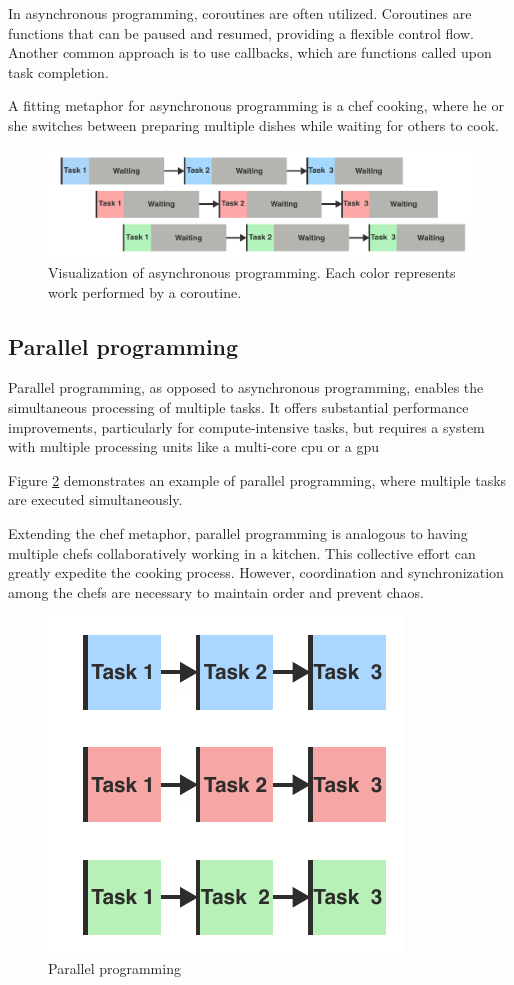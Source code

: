 In asynchronous programming, coroutines are often utilized.
Coroutines are functions that can be paused and resumed, providing a flexible control flow.
Another common approach is to use callbacks, which are functions called upon task completion.

A fitting metaphor for asynchronous programming is a chef cooking, where he or she switches between preparing multiple dishes while waiting for others to cook.


\begin{figure}[H]
    \centering
    \includegraphics[width=\textwidth]{figures/concurrency/concurrent.pdf}
    \caption{Visualization of asynchronous programming.
        Each color represents work performed by a coroutine.}
    \label{fig:concurrency_concurrent}
\end{figure}


\subsection{Parallel programming}
Parallel programming, as opposed to asynchronous programming, enables the simultaneous processing of multiple tasks.
It offers substantial performance improvements, particularly for compute-intensive tasks, but requires a system with multiple processing units like a multi-core \gls{cpu} or a \gls{gpu}

Figure \ref{fig:concurrency_parallel} demonstrates an example of parallel programming, where multiple tasks are executed simultaneously.

Extending the chef metaphor, parallel programming is analogous to having multiple chefs collaboratively working in a kitchen.
This collective effort can greatly expedite the cooking process.
However, coordination and synchronization among the chefs are necessary to maintain order and prevent chaos.

\begin{figure}[H]
    \centering
    \includegraphics[width=.33\textwidth]{figures/concurrency/paralell.pdf}
    \caption{Parallel programming}
    \label{fig:concurrency_parallel}
\end{figure}


